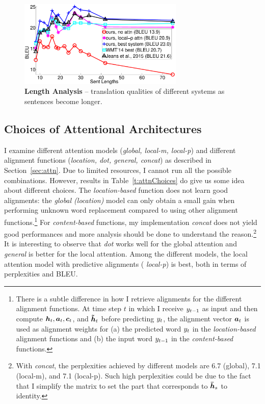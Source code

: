 \begin{figure}[tbh!]
\centering
\includegraphics[width=0.7\textwidth, clip=true, trim=120 0 70 0]{img/4-length} %
\caption[Length Analysis]{{\bf Length Analysis} -- translation qualities of different
systems as sentences become longer.
} 
\label{f:length}
\end{figure}

\subsection{Choices of Attentional Architectures}
I examine different attention models ({\it global, local-m, local-p}) and different
alignment functions ({\it location, dot, general, concat}) as described in
Section~\ref{sec:attn}. Due to limited
resources, I cannot run all the possible combinations.
However, results in Table~\ref{t:attnChoices} do give us some idea about
different choices. 
The {\it location-based} function does not learn good
alignments: the {\it global (location)} model can only obtain a small
gain when performing unknown word replacement compared to using other alignment
functions.\footnote{There is a subtle difference in how I retrieve alignments
for the different alignment functions. At time step $t$ in which I receive
$y_{t-1}$ as input and then compute $\mbox{\boldmath{$h$}}_{t}, \mbox{\boldmath{$a$}}_{t}, \mbox{\boldmath{$c$}}_{t}$, and $\mbox{\boldmath{$\tilde{h}$}}_{t}$ before
predicting $y_{t}$, the alignment vector $\mbox{\boldmath{$a$}}_{t}$ is used as alignment
weights for (a) the predicted word $y_{t}$ in the {\it location-based}
alignment functions and (b) the input word $y_{t-1}$ in the {\it content-based}
functions.}
For {\it content-based} functions, my implementation {\it concat} does not yield good performances
and more analysis should be done to understand the
reason.\footnote{With {\it concat}, the perplexities achieved by different models are 6.7 (global), 7.1
(local-m), and 7.1 (local-p). Such high perplexities could be due to the fact
that I simplify the matrix  to set the part that corresponds to $\mbox{\boldmath{$\bar{h}$}}_{s}$
to identity.} It is interesting to observe that {\it dot} works
well for the global attention and {\it general} is better for the local
attention.
Among the different models, the local attention model with predictive alignments ({\it
local-p}) is best, both in terms of perplexities and BLEU.

